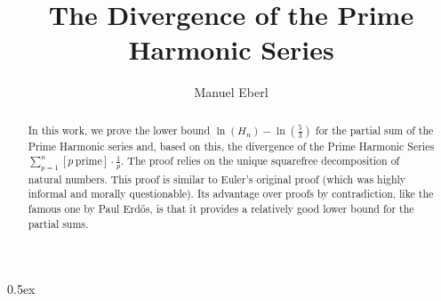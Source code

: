 \documentclass[11pt,a4paper]{article}
\begin{document}
\title{The Divergence of the Prime Harmonic Series}
\author{Manuel Eberl}
\maketitle

\begin{abstract}
In this work, we prove the lower bound $\ln (H_n) - \ln(\frac{5}{3})$ for the partial sum of the Prime Harmonic series and, based on this, the divergence of the Prime Harmonic Series $\sum_{p=1}^n [p\ \mathrm{prime}] \cdot \frac{1}{p}$. The proof relies on the unique squarefree decomposition of natural numbers. This proof is similar to Euler's original proof (which was highly informal and morally questionable). Its advantage over proofs by contradiction, like the famous one by Paul Erd\H{o}s, is that it provides a relatively good lower bound for the partial sums.
\end{abstract}

\tableofcontents

\parindent 0pt\parskip 0.5ex



\nocite{*}


\end{document}
